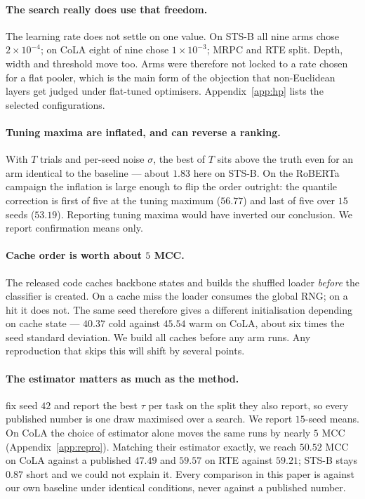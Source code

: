 \documentclass{article}
\begin{document}
\paragraph{The search really does use that freedom.} The learning rate does not
settle on one value. On STS-B all nine arms chose $2\times10^{-4}$; on CoLA
eight of nine chose $1\times10^{-3}$; MRPC and RTE split. Depth, width and
threshold move too. Arms were therefore not locked to a rate chosen for a flat
pooler, which is the main form of the objection that non-Euclidean layers get
judged under flat-tuned optimisers. Appendix~\ref{app:hp} lists the selected
configurations.

\paragraph{Tuning maxima are inflated, and can reverse a ranking.} With $T$
trials and per-seed noise $\sigma$, the best of $T$ sits above the truth even
for an arm identical to the baseline --- about $1.83$ here on STS-B. On the
RoBERTa campaign the inflation is large enough to flip the order outright: the
quantile correction is first of five at the tuning maximum ($56.77$) and last
of five over $15$ seeds ($53.19$). Reporting tuning maxima would have inverted
our conclusion. We report confirmation means only.

\paragraph{Cache order is worth about $5$ MCC.} The released code caches
backbone states and builds the shuffled loader \emph{before} the classifier is
created. On a cache miss the loader consumes the global RNG; on a hit it does
not. The same seed therefore gives a different initialisation depending on cache
state --- $40.37$ cold against $45.54$ warm on CoLA, about six times the seed
standard deviation. We build all caches before any arm runs. Any reproduction
that skips this will shift by several points.

\paragraph{The estimator matters as much as the method.} \citet{mantri2026glot}
fix seed $42$ and report the best $\tau$ per task on the split they also report,
so every published number is one draw maximised over a search. We report
$15$-seed means. On CoLA the choice of estimator alone moves the same runs by
nearly $5$ MCC (Appendix~\ref{app:repro}). Matching their estimator exactly, we
reach $50.52$ MCC on CoLA against a published $47.49$ and $59.57$ on RTE against
$59.21$; STS-B stays $0.87$ short and we could not explain it. Every comparison
in this paper is against our own baseline under identical conditions, never
against a published number.
\end{document}
